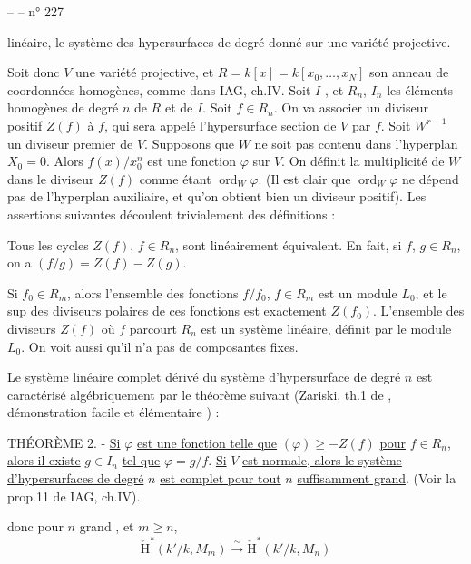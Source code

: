 

--  -- \hfill n° 227

linéaire, le système des hypersurfaces de degré donné sur une variété projective.

Soit donc $V$ une variété projective, et $R=k[x]=k[x_0,\ldots,x_N]$ son anneau de coordonnées homogènes, comme dans IAG, ch.IV. Soit $I$ , et $R_n$, $I_n$ les éléments homogènes de degré $n$ de $R$ et de $I$. Soit $f\in R_n$. On va associer un diviseur positif $Z(f)$ à $f$, qui sera appelé l'hypersurface section de $V$ par $f$. Soit $W^{r-1}$ un diviseur premier de $V$. Supposons que $W$ ne soit pas contenu dans l'hyperplan $X_0=0$. Alors $f(x)/x_0^n$ est une fonction $\varphi$ sur $V$. On définit la multiplicité de $W$ dans le diviseur $Z(f)$ comme étant $\operatorname{ord}_W\varphi$. (Il est clair que $\operatorname{ord}_W\varphi$ ne dépend pas de l'hyperplan auxiliaire, et qu'on obtient bien un diviseur positif). Les assertions suivantes découlent trivialement des définitions :

Tous les cycles $Z(f)$, $f\in R_n$, sont linéairement équivalent. En fait, si $f$, $g\in R_n$, on a $(f/g)=Z(f)-Z(g)$.

Si $f_0\in R_m$, alors l'ensemble des fonctions $f/f_0$, $f\in R_m$ est un module $L_0$, et le sup des diviseurs polaires de ces fonctions est exactement $Z(f_0)$. L'ensemble des diviseurs $Z(f)$ où $f$ parcourt $R_n$ est un système linéaire, définit par le module $L_0$. On voit aussi qu'il n'a pas de composantes fixes.

Le système linéaire complet dérivé du système d'hypersurface de degré $n$ est caractérisé algébriquement par le théorème suivant (Zariski, th.1 de , démonstration facile et élémentaire ) :

THÉORÈME 2. - \uline{Si} $\varphi$ \uline{est une fonction telle que} $(\varphi)\geq-Z(f)$ \uline{pour} $f\in R_n$, \uline{alors il existe} $g\in I_n$ \uline{tel que} $\varphi=g/f$. \uline{Si} $V$ \uline{est normale, alors le système d'hypersurfaces de degré} $n$ \uline{est complet pour tout} $n$ \uline{suffisamment grand}. (Voir la prop.11 de IAG, ch.IV).



donc pour $n$ grand , et $m\geq n$,
\[
\check{\mathrm H}^{*}(k'/k,M_m)\xrightarrow{\sim}\check{\mathrm H}^{*}(k'/k,M_n)
\]

